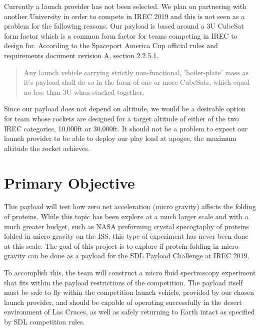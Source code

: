 \documentclass[conference]{IEEEtran} %
\begin{document}
Currently a launch provider has not been selected. We plan on partnering with another University in order to compete in IREC 2019 and this is not seen as a problem for the fallowing reasons. Our payload is based around a 3U CubeSat form factor which is a common form factor for teams competing in IREC to design for. According to the Spaceport America Cup official rules and requirements document revision A, section 2.2.5.1.\begin{quote} Any launch vehicle carrying strictly non-functional, 'boiler-plate' mass as it's payload shall do so in the form of one or more CubeSats, which equal no less than 3U when stacked together.\cite{sdl}\end{quote} Since our payload does not depend on altitude, we would be a desirable option for team whose rockets are designed for a target altitude of either of the two IREC categories, 10,000ft or 30,000ft.\cite{sdl} It should not be a problem to expect our launch provider to be able to deploy our play load at apogee, the maximum altitude the rocket achieves.

%

\section{Primary Objective}
\label{sec:primary-obj}

This payload will test how zero net acceleration (micro gravity) affects the folding of proteins. While this topic has been explore at a much larger scale and with a much greater budget, such as NASA preforming crystal specogtaphy of proteins folded in micro gravity on the ISS, this type of experiment has never been done at this scale. The goal of this project is to explore if protein folding in micro gravity can be done as a payload for the SDL Payload Challenge at IREC 2019. 

To accomplish this, the team will construct a micro fluid spectroscopy experiment that fits within the payload restrictions of the competition. The payload itself must be safe to fly within the competition launch vehicle, provided by our chosen launch provider, and should be capable of operating successfully in the desert environment of Las Cruces, as well as safely returning to Earth intact as specified by SDL competition rules. 
\end{document}
